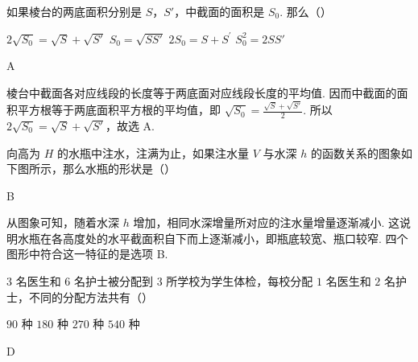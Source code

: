\begin{problem}
如果棱台的两底面积分别是 \(S\)，\(S'\)，中截面的面积是 \(S_0\). 那么（\quad）

\choices
    {\(2\sqrt{S_0} = \sqrt{S} +\sqrt{S'}\)}
    {\(S_0 = \sqrt{SS'}\)}
    {\(2S_{0} = S + S^{\prime}\)}
    {\(S_0^2 = 2SS'\)}
\end{problem}

\begin{answer}
A
\end{answer}

\begin{solution}
棱台中截面各对应线段的长度等于两底面对应线段长度的平均值. 因而中截面的面积平方根等于两底面积平方根的平均值，即
\(\sqrt{S_{0}}=\frac{\sqrt{S}+\sqrt{S'}}{2}\). 所以
\(2\sqrt{S_{0}}=\sqrt{S}+\sqrt{S'}\)，故选 A.
\end{solution}

\begin{problem}
向高为 \(H\) 的水瓶中注水，注满为止，如果注水量 \(V\) 与水深 \(h\) 的函数关系的图象如下图所示，那么水瓶的形状是（\quad）

    {}
    {}
    {}
\end{problem}

\begin{answer}
B
\end{answer}

\begin{solution}
从图象可知，随着水深 \(h\) 增加，相同水深增量所对应的注水量增量逐渐减小. 这说明水瓶在各高度处的水平截面积自下而上逐渐减小，即瓶底较宽、瓶口较窄. 四个图形中符合这一特征的是选项 B.
\end{solution}

\begin{problem}
\(3\) 名医生和 \(6\) 名护士被分配到 \(3\) 所学校为学生体检，每校分配 \(1\) 名医生和 \(2\) 名护士，不同的分配方法共有（\quad）

\choices
    {\(90\) 种}
    {\(180\) 种}
    {\(270\) 种}
    {\(540\) 种}
\end{problem}

\begin{answer}
D
\end{answer}

